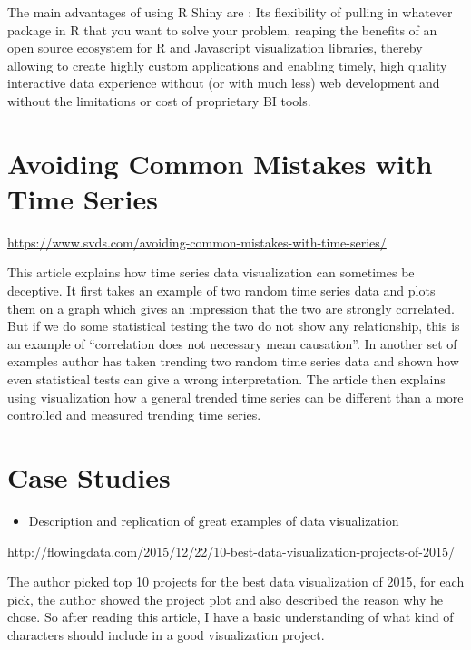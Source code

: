 \documentclass[]{book}
\providecommand{\tightlist}{%
  \setlength{\itemsep}{0pt}\setlength{\parskip}{0pt}}
\theoremstyle{definition}
\theoremstyle{definition}
\theoremstyle{definition}
\theoremstyle{remark}
\begin{document}
The main advantages of using R Shiny are : Its flexibility of pulling in
whatever package in R that you want to solve your problem, reaping the
benefits of an open source ecosystem for R and Javascript visualization
libraries, thereby allowing to create highly custom applications and
enabling timely, high quality interactive data experience without (or
with much less) web development and without the limitations or cost of
proprietary BI tools.

\citep{shiny_interactive_viz}

\chapter{Avoiding Common Mistakes with Time
Series}\label{avoiding-common-mistakes-with-time-series}

\url{https://www.svds.com/avoiding-common-mistakes-with-time-series/}

This article explains how time series data visualization can sometimes
be deceptive. It first takes an example of two random time series data
and plots them on a graph which gives an impression that the two are
strongly correlated. But if we do some statistical testing the two do
not show any relationship, this is an example of ``correlation does not
necessary mean causation''. In another set of examples author has taken
trending two random time series data and shown how even statistical
tests can give a wrong interpretation. The article then explains using
visualization how a general trended time series can be different than a
more controlled and measured trending time series.

\chapter{Case Studies}\label{case-studies}

\begin{itemize}
\tightlist
\item
  Description and replication of great examples of data visualization
\end{itemize}

\url{http://flowingdata.com/2015/12/22/10-best-data-visualization-projects-of-2015/}

The author picked top 10 projects for the best data visualization of
2015, for each pick, the author showed the project plot and also
described the reason why he chose. So after reading this article, I have
a basic understanding of what kind of characters should include in a
good visualization project.
\end{document}
